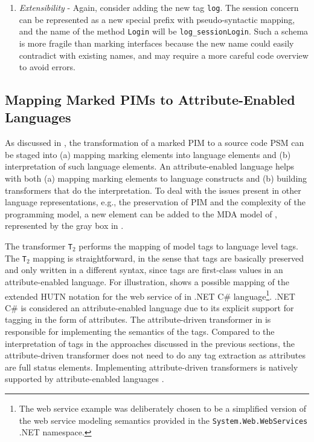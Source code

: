 \begin{enumerate}
\item \textit{Extensibility} - Again, consider adding the new tag {\tt log}. The session concern can be represented as a new special prefix with pseudo-syntactic mapping, and the name of the method {\tt Login} will be {\tt log\_sessionLogin}. Such a schema is more fragile than marking interfaces because the new name could easily contradict with existing names, and may require a more careful code overview to avoid errors.
\end{enumerate}

\subsection{Mapping Marked PIMs to Attribute-Enabled Languages}
\label{sec.gaast.map}

As discussed in , the transformation of a marked PIM to a source code PSM can be staged into (a) mapping marking elements into language elements and (b) interpretation of such language elements. An attribute-enabled language helps with both (a) mapping marking elements to language constructs and (b) building transformers that do the interpretation. To deal with the issues present in other language representations, e.g., the preservation of PIM and the complexity of the programming model, a new element can be added to the MDA model of , represented by the gray box in . 

The transformer \texttt{T$_{2}$} performs the mapping of model tags to language level tags. 
The \texttt{T$_{2}$} mapping is straightforward, in the sense that tags are basically preserved and only written in a different syntax, since tags are first-class values in an attribute-enabled language. For illustration,  shows a possible mapping of the extended HUTN notation for the web service of  in .NET C\# language\footnote{The web service example was deliberately chosen to be a simplified version of the web service modeling semantics provided in the \texttt{System.Web.WebServices} .NET namespace.}. .NET C\# is considered an attribute-enabled language due to its explicit support for tagging in the form of attributes.
The attribute-driven transformer in  is responsible for implementing the semantics of the tags. Compared to the interpretation of tags in the approaches discussed in the previous sections, the attribute-driven transformer does not need to do any tag extraction as attributes are full status elements. Implementing attribute-driven transformers is natively supported by attribute-enabled languages . 

